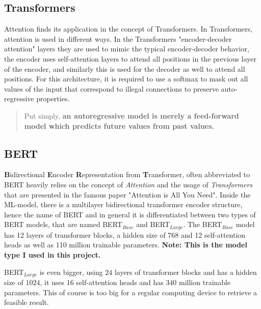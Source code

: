    \subsection{Transformers}
    \label{sec:-transformers}
    
        Attention finds its application in the concept of Transformers. 
        In Transformers, attention is used in different ways.
        In the Transformers "encoder-decoder attention" layers they are used to mimic the typical encoder-decoder behavior, the encoder uses self-attention layers to attend all positions in the previous layer of the encoder, and similarly this is used for the decoder as well to attend all positions.
        For this architecture, it is required to use a softmax to mask out all values of the input that correspond to illegal connections to preserve auto-regressive properties.

        \begin{quote}
            Put simply, \textbf{an autoregressive model is merely a feed-forward model which predicts future values from past values.} \cite{autoregressiveGeorge}
        \end{quote}
    
    
    \subsection{BERT}
    \label{sec:-bert}

        \textbf{B}idirectional \textbf{E}ncoder \textbf{R}epresentation from \textbf{T}ransformer, often abbreviated to BERT heavily relies on the concept of \emph{Attention} and the usage of \emph{Transformers} that are presented in the famous paper "Attention is All You Need"\cite{vaswani2017attention}.
        Inside the ML-model, there is a multilayer bidirectional transformer encoder structure, hence the name of BERT and in general it is differentiated between two types of BERT models, that are named BERT$_{Base}$ and BERT$_{Large}$.
        The BERT$_{Base}$ model has 12 layers of transformer blocks, a hidden size of $768$ and 12 self-attention heads as well as 110 million trainable parameters. \textbf{Note: This is the model type I used in this project.}

        BERT$_{Large}$ is even bigger, using $24$ layers of transformer blocks and has a hidden size of $1024$, it uses 16 self-attention heads and has $340$ million trainable parameters. This of course is too big for a regular computing device to retrieve a feasible result.


